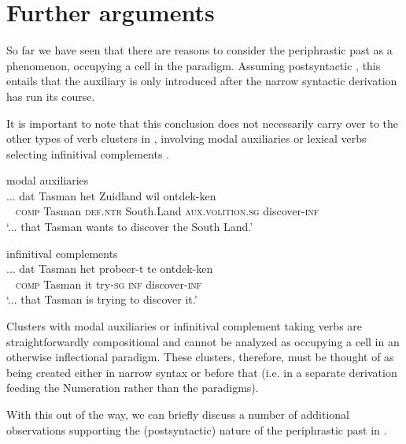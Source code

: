 \documentclass[output=paper]{LSP/langsci}
\begin{document}
\section{Further arguments}\label{sec:zwart:4} 

So far we have seen that there are reasons to consider the periphrastic past as a  phenomenon, occupying a cell in the  paradigm. Assuming postsyntactic , this entails that the auxiliary is only introduced after the narrow syntactic derivation has run its course.

It is important to note that this conclusion does not necessarily carry over to the other types of verb clusters in , involving modal auxiliaries  or lexical verbs selecting infinitival complements .

\ea%
\label{ex:zwart:7}
\ea \label{ex:zwart:7a}
modal auxiliaries\\
\gll
  ...  dat  Tasman    het  Zuidland  wil      ontdek-ken\\
  ~ \textsc{comp}  Tasman    \textsc{def.ntr}  South.Land  \textsc{aux.volition.sg}  discover-\textsc{inf}\\
\glt   ‘... that Tasman wants to discover the South Land.’

\ex \label{ex:zwart:7b}
infinitival complements\\
\gll  ...  dat  Tasman    het  probeer-t  te  ontdek-ken\\
~  \textsc{comp}  Tasman    it  try-\textsc{sg}    \textsc{inf}  discover-\textsc{inf}\\
\glt   ‘... that Tasman is trying to discover it.’
\z
\z


Clusters with modal auxiliaries or infinitival complement taking verbs are straightforwardly compositional and cannot be analyzed as occupying a cell in an otherwise inflectional  paradigm. These clusters, therefore, must be thought of as being created either in narrow syntax or before that (i.e. in a separate derivation feeding the Numeration rather than the  paradigms).

With this out of the way, we can briefly discuss a {number} of additional observations supporting the  (postsyntactic) nature of the periphrastic past in .
\end{document}
